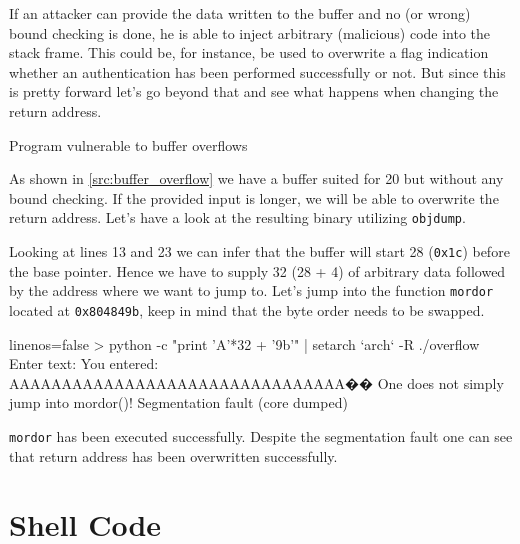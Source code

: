 \documentclass[article]{uibk}
\begin{document}
If an attacker can provide the data written to the buffer and no (or wrong)
bound checking is done, he is able to inject arbitrary (malicious) code into
the stack frame. This could be, for instance, be used to overwrite a flag
indication whether an authentication has been performed successfully or not.
But since this is pretty forward let's go beyond that and see what happens when
changing the return address.

\begin{listing}[h!]
    \begin{minipage}[t]{0.37\textwidth}
    \end{minipage}\hfill
    \begin{minipage}[t]{0.63\textwidth}
    \end{minipage}
    \caption{Program vulnerable to buffer overflows}
    \label{src:buffer_overflow}
\end{listing}

As shown in \cref{src:buffer_overflow} we have a buffer suited for
\SI{20}{\byte} but without any bound checking. If the provided input is longer,
we will be able to overwrite the return address. Let's have a look at the
resulting binary utilizing \texttt{objdump}.

Looking at lines 13 and 23 we can infer that the buffer will start
\SI{28}{\byte} (\texttt{0x1c}) before the base pointer. Hence we have to supply
\SI{32}{\byte} (28 + 4) of arbitrary data followed by the address where we want
to jump to. Let's jump into the function \texttt{mordor} located at
\texttt{0x804849b}, keep in mind that the byte order needs to be swapped.

\begin{code*}{linenos=false}
> python -c "print 'A'*32 + '\x9b'" | setarch `arch` -R ./overflow
Enter text:
You entered: AAAAAAAAAAAAAAAAAAAAAAAAAAAAAAAA��
One does not simply jump into mordor()!
Segmentation fault (core dumped)
\end{code*}

\texttt{mordor} has been executed successfully. Despite the segmentation
fault one can see that return address has been overwritten successfully.

\section{Shell Code}
\end{document}
